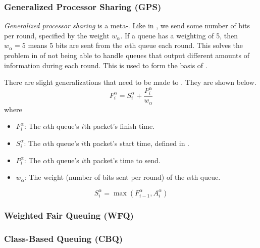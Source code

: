 \subsubsection{Generalized Processor Sharing (GPS)}\label{subsubsec:Generalized_Processor_Sharing}
\begin{definition}\label{def:Generalized_Processor_Sharing}
  \emph{Generalized processor sharing} is a  meta-.
  Like in , we send some number of bits per round, specified by the weight $w_{\alpha}$.
  If a queue has a weighting of 5, then $w_{\alpha} = 5$ means 5 bits are sent from the $\alpha$th queue each round.
  This solves the problem in  of not being able to handle queues that output different amounts of information during each round.
  This is used to form the basis of .

  There are slight generalizations that need to be made to .
  They are shown below.
  \begin{equation}\label{eq:GPS_Finish_Time}
    F_{i}^{\alpha} = S_{i}^{\alpha} + \frac{P_{i}^{\alpha}}{w_{\alpha}}
  \end{equation}
  where
  \begin{itemize}[noitemsep]
  \item $F_{i}^{\alpha}$: The $\alpha$th queue's $i$th packet's finish time.
  \item $S_{i}^{\alpha}$: The $\alpha$th queue's $i$th packet's start time, defined in .
  \item $P_{i}^{\alpha}$: The $\alpha$th queue's $i$th packet's time to send.
  \item $w_{\alpha}$: The weight (number of bits sent per round) of the $\alpha$th queue.
  \end{itemize}

  \begin{equation}\label{eq:GPS_Start_Time}
    S_{i}^{\alpha} = \max \left( F_{i-1}^{\alpha}, A_{i}^{\alpha} \right)
  \end{equation}
\end{definition}

\subsubsection{Weighted Fair Queuing (WFQ)}\label{subsubsec:Weighted_Fair_Queuing}
\subsubsection{Class-Based Queuing (CBQ)}\label{subsubsec:Class_Based_Queuing}
